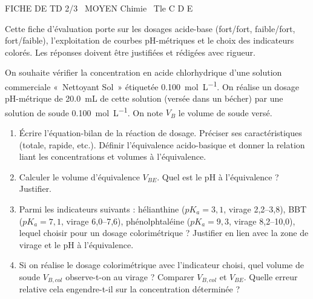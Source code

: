 \documentclass[11pt]{article}
\begin{document}
\begin{tcolorbox}[enhanced,colback=popink,colframe=popink,arc=10pt,boxrule=0pt,left=12pt,right=12pt,top=9pt,bottom=9pt]
{\color{white}\popxbold\small FICHE DE TD 2/3 \textbullet\ MOYEN \hfill Chimie \textbullet\ Tle C D E\par}
\end{tcolorbox}
\vspace{4pt}
\noindent Cette fiche d'évaluation porte sur les dosages acide-base (fort/fort, faible/fort, fort/faible), l'exploitation de courbes pH-métriques et le choix des indicateurs colorés. Les réponses doivent être justifiées et rédigées avec rigueur.

\begin{exercice}
On souhaite vérifier la concentration en acide chlorhydrique d'une solution commerciale «~Nettoyant Sol~» étiquetée \SI{0,100}{mol.L^{-1}}. On réalise un dosage pH-métrique de \SI{20,0}{mL} de cette solution (versée dans un bécher) par une solution de soude  \SI{0,100}{mol.L^{-1}}. On note $V_B$ le volume de soude versé.
\begin{enumerate}
    \item Écrire l'équation-bilan de la réaction de dosage. Préciser ses caractéristiques (totale, rapide, etc.). Définir l'équivalence acido-basique et donner la relation liant les concentrations et volumes à l'équivalence.
    \item Calculer le volume d'équivalence $V_{BE}$. Quel est le pH à l'équivalence ? Justifier.
    \item Parmi les indicateurs suivants : hélianthine ($pK_a = 3,1$, virage 2,2--3,8), BBT ($pK_a = 7,1$, virage 6,0--7,6), phénolphtaléine ($pK_a = 9,3$, virage 8,2--10,0), lequel choisir pour un dosage colorimétrique ? Justifier en lien avec la zone de virage et le pH à l'équivalence.
    \item Si on réalise le dosage colorimétrique avec l'indicateur choisi, quel volume de soude $V_{B,col}$ observe-t-on au virage ? Comparer $V_{B,col}$ et $V_{BE}$. Quelle erreur relative cela engendre-t-il sur la concentration déterminée ?
\end{enumerate}
\end{exercice}
\end{document}
